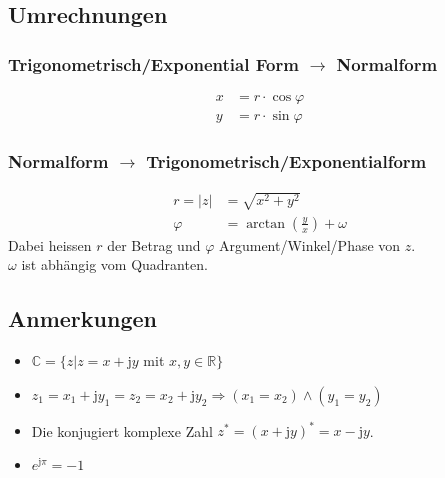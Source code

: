 \subsection{Umrechnungen}
\subsubsection{Trigonometrisch/Exponential Form $\rightarrow$ Normalform}
\begin{align*}
	x& = r \cdot \cos \varphi\\
	y& = r \cdot \sin \varphi
\end{align*}

\subsubsection{Normalform $\rightarrow$ Trigonometrisch/Exponentialform}
\begin{align*}
	r = |z|& = \sqrt{x^2 + y^2}\\
	\varphi& = \arctan \left(\frac{y}{x}\right) + \omega
\end{align*}
Dabei heissen $r$ der Betrag und $\varphi$ Argument/Winkel/Phase von $z$.\\
$\omega$ ist abhängig vom Quadranten.

\subsection{Anmerkungen}
\begin{itemize}\itemsep0em
	\item $\mathbb{C} = \{z | z = x + \mathrm j y$ mit $x, y \in \mathbb{R}\}$
	\item $z_1 = x_1 + \mathrm j y_1  = z_2 = x_2 + \mathrm j y_2 \Rightarrow (x_1 = x_2) \wedge (y_1 = y_2)$
	\item Die konjugiert komplexe Zahl $z^* = (x + \mathrm j y)^* = x - \mathrm j y$.
	\item $e^{\mathrm j \pi} = -1$
\end{itemize}
